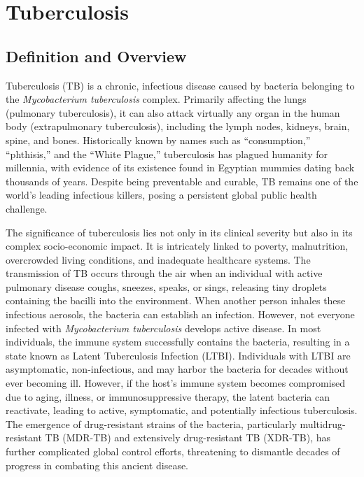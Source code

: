 \chapter{Tuberculosis}

\section*{Definition and Overview}
Tuberculosis (TB) is a chronic, infectious disease caused by bacteria belonging to the \textit{Mycobacterium tuberculosis} complex. Primarily affecting the lungs (pulmonary tuberculosis), it can also attack virtually any organ in the human body (extrapulmonary tuberculosis), including the lymph nodes, kidneys, brain, spine, and bones. Historically known by names such as ``consumption,'' ``phthisis,'' and the ``White Plague,'' tuberculosis has plagued humanity for millennia, with evidence of its existence found in Egyptian mummies dating back thousands of years. Despite being preventable and curable, TB remains one of the world's leading infectious killers, posing a persistent global public health challenge.

The significance of tuberculosis lies not only in its clinical severity but also in its complex socio-economic impact. It is intricately linked to poverty, malnutrition, overcrowded living conditions, and inadequate healthcare systems. The transmission of TB occurs through the air when an individual with active pulmonary disease coughs, sneezes, speaks, or sings, releasing tiny droplets containing the bacilli into the environment. When another person inhales these infectious aerosols, the bacteria can establish an infection. However, not everyone infected with \textit{Mycobacterium tuberculosis} develops active disease. In most individuals, the immune system successfully contains the bacteria, resulting in a state known as Latent Tuberculosis Infection (LTBI). Individuals with LTBI are asymptomatic, non-infectious, and may harbor the bacteria for decades without ever becoming ill. However, if the host's immune system becomes compromised due to aging, illness, or immunosuppressive therapy, the latent bacteria can reactivate, leading to active, symptomatic, and potentially infectious tuberculosis. The emergence of drug-resistant strains of the bacteria, particularly multidrug-resistant TB (MDR-TB) and extensively drug-resistant TB (XDR-TB), has further complicated global control efforts, threatening to dismantle decades of progress in combating this ancient disease.

